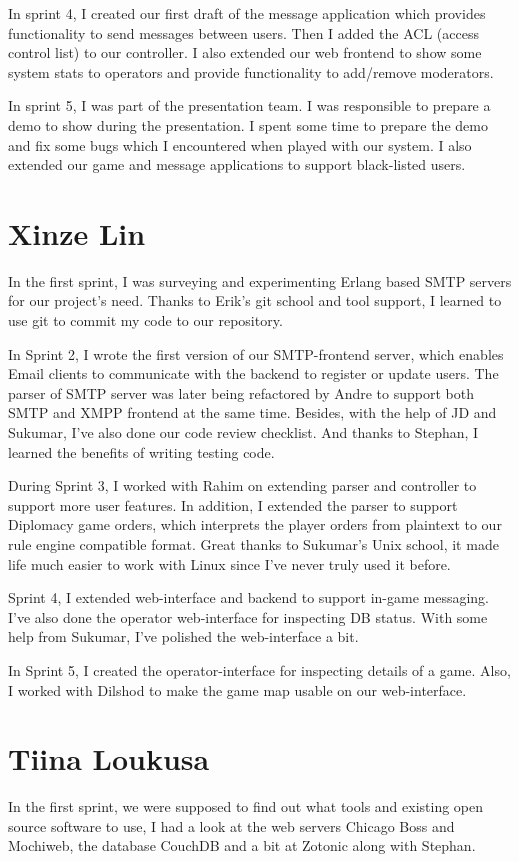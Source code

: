 \documentclass[11pt,a4paper]{report}
\begin{document}
In sprint 4, I created our first draft of the message application which provides functionality
to send messages between users. Then I added the ACL (access control list) to our controller.
I also extended our web frontend to show some system stats to
operators and provide functionality to add/remove moderators.

In sprint 5, I was part of the presentation team. I was responsible
to prepare a demo to show during the presentation. I spent some time to
 prepare the demo and fix some bugs which I encountered when played with our system.
 I also extended our game and message applications to support black-listed users.

\section{Xinze Lin}
In the first sprint, I was surveying and experimenting Erlang based SMTP servers for our project's need.
Thanks to Erik's git school and tool support, I learned to use git to commit my code to our repository.

In Sprint 2, I wrote the first version of our SMTP-frontend server,
which enables Email clients to communicate with the backend to register or update users.
The parser of SMTP server was later being refactored by Andre to support both SMTP and XMPP frontend at the same time.
Besides, with the help of JD and Sukumar, I've also done our code review checklist.
And thanks to Stephan, I learned the benefits of writing testing code.

During Sprint 3, I worked with Rahim on extending parser and controller to support more user features.
In addition, I extended the parser to support Diplomacy game orders,
which interprets the player orders from plaintext to our rule engine compatible format.
Great thanks to Sukumar's Unix school,
it made life much easier to work with Linux since I've never truly used it before.

Sprint 4, I extended web-interface and backend to support in-game messaging.
I've also done the operator web-interface for inspecting DB status.
With some help from Sukumar, I've polished the web-interface a bit.

In Sprint 5, I created the operator-interface for inspecting details of a game.
Also, I worked with Dilshod to make the game map usable on our web-interface.
\section{Tiina Loukusa}
In the first sprint, we were supposed to find out what tools and existing
open source software to use, I had a look at the web servers Chicago Boss and
Mochiweb, the database CouchDB and a bit at Zotonic along with Stephan.
\end{document}
